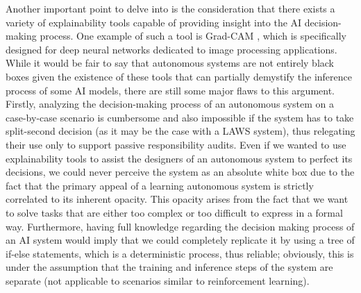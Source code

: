 Another important point to delve into is the consideration that there exists a variety of explainability tools capable of providing insight into the AI decision-making process.
One example of such a tool is Grad-CAM \parencite{RAMGCW}, which is specifically designed for deep neural networks dedicated to image processing applications.
While it would be fair to say that autonomous systems are not entirely black boxes given the existence of these tools that can partially demystify the inference process of some AI models, there are still some major flaws to this argument.
Firstly, analyzing the decision-making process of an autonomous system on a case-by-case scenario is cumbersome and also impossible if the system has to take split-second decision (as it may be the case with a LAWS system), thus relegating their use only to support passive responsibility audits.
Even if we wanted to use explainability tools to assist the designers of an autonomous system to perfect its decisions, we could never perceive the system as an absolute white box due to the fact that the primary appeal of a learning autonomous system is strictly correlated to its inherent opacity.
This opacity arises from the fact that we want to solve tasks that are either too complex or too difficult to express in a formal way.
Furthermore, having full knowledge regarding the decision making process of an AI system would imply that we could completely replicate it by using a tree of if-else statements, which is a deterministic process, thus reliable; obviously, this is under the assumption that the training and inference steps of the system are separate (not applicable to scenarios similar to reinforcement learning).